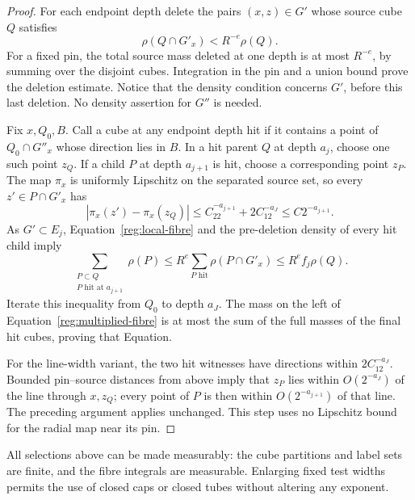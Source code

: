 \begin{proof}
For each endpoint depth delete the pairs $(x,z)\in G'$ whose source
cube $Q$ satisfies
\[
\rho(Q\cap G'_x)<R^{-e}\rho(Q).
\]
For a fixed pin, the total source mass deleted at one depth is at most
$R^{-e}$, by summing over the disjoint cubes.  Integration in the pin
and a union bound prove the deletion estimate.  Notice that the
density condition concerns $G'$, before this last deletion.  No
density assertion for $G''$ is needed.

Fix $x,Q_0,B$.  Call a cube at any endpoint depth hit if it contains a
point of $Q_0\cap G''_x$ whose direction lies in $B$.  In a hit parent
$Q$ at depth $a_j$, choose one such point $z_Q$.  If a child $P$ at
depth $a_{j+1}$ is hit, choose a corresponding point $z_P$.  The map
$\pi_x$ is uniformly Lipschitz on the separated source set, so every
$z'\in P\cap G'_x$ has
\[
|\pi_x(z')-\pi_x(z_Q)|
 \le C_22^{-a_{j+1}}+2C_12^{-a_J}
 \le C2^{-a_{j+1}}.
\]
As $G'\subset E_j$, Equation~\eqref{reg:local-fibre} and the
pre-deletion density of every hit child imply
\[
\sum_{\substack{P\subset Q\\P\text{ hit at }a_{j+1}}}\rho(P)
 \le R^e\sum_{P\text{ hit}}\rho(P\cap G'_x)
 \le R^ef_j\rho(Q).
\]
Iterate this inequality from $Q_0$ to depth $a_J$.  The mass on the
left of Equation~\eqref{reg:multiplied-fibre} is at most the sum of the
full masses of the final hit cubes, proving that Equation.

For the line-width variant, the two hit witnesses have directions
within $2C_12^{-a_J}$.  Bounded pin--source distances from above imply
that $z_P$ lies within $O(2^{-a_J})$ of the line through $x,z_Q$;
every point of $P$ is then within $O(2^{-a_{j+1}})$ of that line.
The preceding argument applies unchanged.  This step uses no
Lipschitz bound for the radial map near its pin.
\end{proof}

All selections above can be made measurably: the cube partitions and
label sets are finite, and the fibre integrals are measurable.
Enlarging fixed test widths permits the use of closed caps or closed
tubes without altering any exponent.
